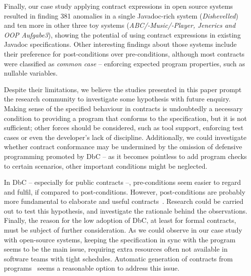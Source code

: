 Finally, our case study applying contract expressions in open source systems resulted in finding 381 anomalies in a single Javadoc-rich system (\emph{Dishevelled}) and ten more in other three toy systems (\emph{ABC/-Music/-Player, Jenerics and OOP Aufgabe3}), showing the potential of using contract expressions in existing Javadoc specifications.
Other interesting findings about those systems include their preference for post-conditions over pre-conditions, although most contracts were classified as \emph{common case} -- enforcing expected program properties, such as nullable variables.

Despite their limitations, we believe the studies presented in this paper prompt the research community to investigate some hypothesis with future enquiry. 
Making sense of the specified behaviour in contracts is undoubtedly a necessary condition to providing a program that conforms to the specification, but it is not sufficient; other forces should be considered, such as tool support, enforcing test cases or even the developer's lack of discipline.  
Additionally, we could investigate whether contract conformance may be undermined by the omission of defensive programming promoted by DbC -- as it becomes pointless to add program checks to certain scenarios, other important conditions might be neglected. 


In DbC -- especially for public contracts --, pre-conditions seem easier to regard and fulfil, if compared to post-conditions. However, post-conditions are probably more fundamental to elaborate and useful contracts~\cite{Rosenblum}. Research could be carried out to test this hypothesis, and investigate the rationale behind the observations.   
Finally, the reason for the low adoption of DbC, at least for formal contracts, must be subject of further consideration. As we could observe in our case study with open-source systems, keeping the specification in sync with the program seems to be the main issue, requiring extra resources often not available in software teams with tight schedules. Automatic generation of contracts from programs~\cite{docAnalysis,atComment} seems a reasonable option to address this issue.  

